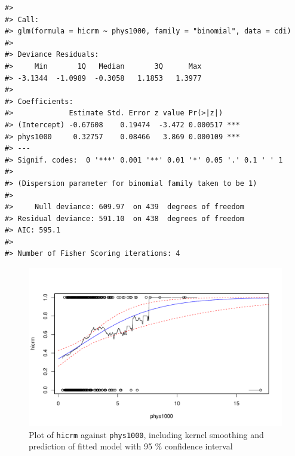 \documentclass[a4paper]{article}
\begin{document}
\begin{verbatim}
#> 
#> Call:
#> glm(formula = hicrm ~ phys1000, family = "binomial", data = cdi)
#> 
#> Deviance Residuals: 
#>     Min       1Q   Median       3Q      Max  
#> -3.1344  -1.0989  -0.3058   1.1853   1.3977  
#> 
#> Coefficients:
#>             Estimate Std. Error z value Pr(>|z|)    
#> (Intercept) -0.67608    0.19474  -3.472 0.000517 ***
#> phys1000     0.32757    0.08466   3.869 0.000109 ***
#> ---
#> Signif. codes:  0 '***' 0.001 '**' 0.01 '*' 0.05 '.' 0.1 ' ' 1
#> 
#> (Dispersion parameter for binomial family taken to be 1)
#> 
#>     Null deviance: 609.97  on 439  degrees of freedom
#> Residual deviance: 591.10  on 438  degrees of freedom
#> AIC: 595.1
#> 
#> Number of Fisher Scoring iterations: 4
\end{verbatim}

\begin{figure}[h]
\includegraphics{Project_2_files/figure-latex/code_plot-1} \caption{\label{fig:hicrm_phys1000}Plot of \texttt{hicrm} against \texttt{phys1000}, including kernel smoothing and prediction of fitted model with 95 \% confidence interval}\label{fig:code_plot}
\end{figure}
\end{document}

